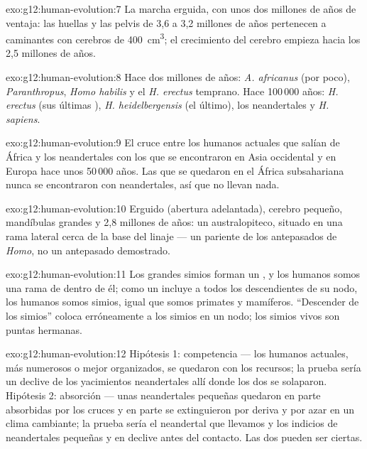 \begin{solution}{exo:g12:human-evolution:7}
La marcha erguida, con unos dos millones de años de ventaja: las
huellas y las pelvis de 3,6 a 3,2 millones de años pertenecen a
caminantes con cerebros de \qty{400}{cm^3}; el crecimiento del cerebro
empieza hacia los 2,5 millones de años.
\end{solution}

\begin{solution}{exo:g12:human-evolution:8}
Hace dos millones de años: \emph{A. africanus} (por poco),
\emph{Paranthropus}, \emph{Homo habilis} y el \emph{H. erectus}
temprano. Hace 100\,000 años: \emph{H. erectus} (sus últimas
), \emph{H. heidelbergensis} (el último), los neandertales y
\emph{H. sapiens}.
\end{solution}

\begin{solution}{exo:g12:human-evolution:9}
El cruce entre los humanos actuales que salían de África y los
neandertales con los que se encontraron en Asia occidental y en Europa
hace unos 50\,000 años. Las  que se quedaron en el África
subsahariana nunca se encontraron con neandertales, así que no llevan
nada.
\end{solution}

\begin{solution}{exo:g12:human-evolution:10}
Erguido (abertura adelantada), cerebro pequeño, mandíbulas grandes y
2,8 millones de años: un australopiteco, situado en una rama lateral
cerca de la base del linaje --- un pariente de los antepasados de
\emph{Homo}, no un antepasado demostrado.
\end{solution}

\begin{solution}{exo:g12:human-evolution:11}
Los grandes simios forman un , y los humanos somos una rama de
dentro de él; como un  incluye a todos los descendientes de su
nodo, los humanos somos simios, igual que somos primates y mamíferos.
``Descender de los simios'' coloca erróneamente a los simios en un
nodo; los simios vivos son puntas hermanas.
\end{solution}

\begin{solution}{exo:g12:human-evolution:12}
Hipótesis 1: competencia --- los humanos actuales, más numerosos o
mejor organizados, se quedaron con los recursos; la prueba sería un
declive de los yacimientos neandertales allí donde los dos se
solaparon. Hipótesis 2: absorción --- unas  neandertales
pequeñas quedaron en parte absorbidas por los cruces y en parte se
extinguieron por deriva y por azar en un clima cambiante; la prueba
sería el  neandertal que llevamos y los indicios de 
neandertales pequeñas y en declive antes del contacto. Las dos pueden
ser ciertas.
\end{solution}

